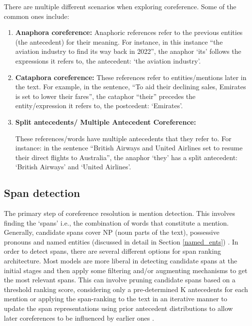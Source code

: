 There are multiple different scenarios when exploring coreference. Some of the common ones include: 

\begin{enumerate}
    \item \textbf{Anaphora coreference: }
    Anaphoric references refer to the previous entities (the antecedent) for their meaning. For instance, in this instance “the aviation industry to find its way back in 2022”, the anaphor ‘its’ follows the expressions it refers to, the antecedent: ‘the aviation industry’. 
    
    \item \textbf{Cataphora coreference:}
    These references refer to entities/mentions later in the text. For example, in the sentence, “To aid their declining sales, Emirates is set to lower their fares”, the cataphor “their” precedes the entity/expression it refers to, the postcedent: ‘Emirates’. 
    
    \item \textbf{Split antecedents/ Multiple Antecedent Coreference:}

    These references/words have multiple antecedents that they refer to. For instance: in the sentence “British Airways and United Airlines set to resume their direct flights to Australia”, the anaphor ‘they’ has a split antecedent: ‘British Airways’ and ‘United Airlines’. 
\end{enumerate}

\subsection{Span detection}

The primary step of coreference resolution is mention detection. This involves finding the ‘spans’ i.e., the combination of words that constitute a mention. Generally, candidate spans cover NP (noun parts of the text), possessive pronouns and named entities \cite{stanfordcoref} (discussed in detail in Section \ref{named_ents}) . In order to detect spans, there are several different options for span ranking architecture. Most models are more liberal in detecting candidate spans at the initial stages and then apply some filtering and/or augmenting mechanisms to get the most relevant spans. This can involve pruning candidate spans based on a threshold ranking score, considering only a pre-determined K antecedents for each mention \cite{lee2018coursetofine} or applying the span-ranking to the text in an iterative manner to update the span representations using prior antecedent distributions to allow later coreferences to be influenced by earlier ones \cite{lee2018coursetofine}. 

